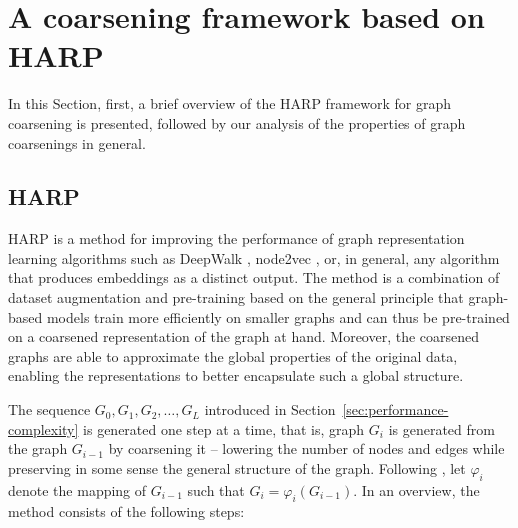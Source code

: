 \section{A coarsening framework based on HARP}\label{sec:harp-framework}

In this Section, first, a brief overview of the HARP framework for graph coarsening \cite{chen_harp_2018} is presented, followed by our analysis of the properties of graph coarsenings in general.

\subsection{HARP}\label{sec:harp}
HARP is a method for improving the performance of graph representation learning algorithms such as DeepWalk \cite{perozzi_deepwalk_2014}, node2vec \cite{grover_node2vec_2016}, or, in general, any algorithm that produces embeddings as a distinct output. The method is a combination of dataset augmentation and pre-training based on the general principle that graph-based models train more efficiently on smaller graphs and can thus be pre-trained on a coarsened representation of the graph at hand. Moreover, the coarsened graphs are able to approximate the global properties of the original data, enabling the representations to better encapsulate such a global structure.

The sequence \( G_0, G_1, G_2, \dots, G_L \) introduced in Section~\ref{sec:performance-complexity} is generated one step at a time, that is, graph \( G_i \) is generated from the graph \( G_{i - 1} \) by coarsening it -- lowering the number of nodes and edges while preserving in some sense the general structure of the graph. Following \cite{chen_harp_2018}, let \( \varphi_i \) denote the mapping of \( G_{i - 1} \) such that \( G_i = \varphi_i \left( G_{i - 1} \right) \). In an overview, the method consists of the following steps:

